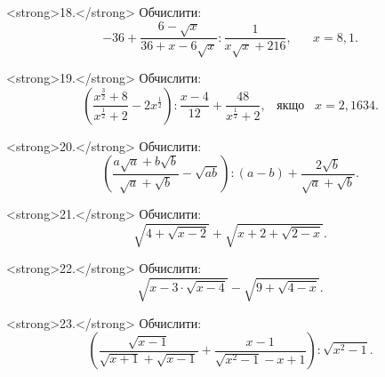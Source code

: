 <strong>18.</strong> Обчислити:
$$-36 + \dfrac{6 - \sqrt{x}}{36 + x - 6\sqrt{x}} : \dfrac{1}{x\sqrt{x} + 216}, \;\;\; \mbox{} \;\;\; x = 8,1.$$

<strong>19.</strong> Обчислити:
$$\left(\dfrac{x^\frac{3}{2} + 8}{x^\frac{1}{2} + 2} - 2x^\frac{1}{2}\right) : \dfrac{x - 4}{12} + \dfrac{48}{x^\frac{1}{2} + 2}, \;\;\; \mbox{якщо} \;\;\; x = 2,1634.$$

<strong>20.</strong> Обчислити:
$$\left(\dfrac{a\sqrt{a} + b\sqrt{b}}{\sqrt{a} + \sqrt{b}} - \sqrt{ab}\right) : (a - b) + \dfrac{2\sqrt{b}}{\sqrt{a} + \sqrt{b}}.$$

<strong>21.</strong> Обчислити:
$$\sqrt{4+\sqrt{x-2}}+\sqrt{x+2+\sqrt{2-x}}.$$

<strong>22.</strong> Обчислити:
$$\sqrt{x-3\cdot\sqrt{x-4}}-\sqrt{9+\sqrt{4-x}}.$$

<strong>23.</strong> Обчислити:
$$
\left(\dfrac{\sqrt{x-1}}{\sqrt{x+1}+\sqrt{x-1}}+\dfrac{x-1}{\sqrt{x^2-1}-x+1}\right):\sqrt{x^2-1}.
$$
